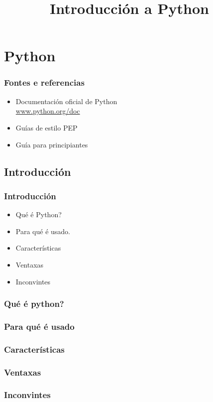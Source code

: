 
\title[Python]{Introducción a Python}
\date{}
\author[Fran Rúa/Breixo Camiña]{}
\institute{}

\section{Python}
\label{sec:Python}

\begin{frame}
  \titlepage
\end{frame}

\begin{frame}
  \frametitle{Fontes e referencias}
  \begin{itemize}
    \item Documentación oficial de Python\\
      {\color{blue}\url{www.python.org/doc}}
    \item Guías de estilo PEP
    \item Guía para principiantes
  \end{itemize}
\end{frame}

\subsection{Introducción}
\label{subsec:Introduccion}

\begin{frame}
  \frametitle{Introducción}
  \begin{itemize}
    \item Qué é Python?
    \item Para qué é usado.
    \item Características
    \item Ventaxas
    \item Inconvintes
  \end{itemize}
\end{frame}

\begin{frame}
  \frametitle{Qué é python?}
  
\end{frame}

\begin{frame}
  \frametitle{Para qué é usado}
  
\end{frame}

\begin{frame}
  \frametitle{Características}
  
\end{frame}

\begin{frame}
  \frametitle{Ventaxas}
  
\end{frame}

\begin{frame}
  \frametitle{Inconvintes}
  
\end{frame}
